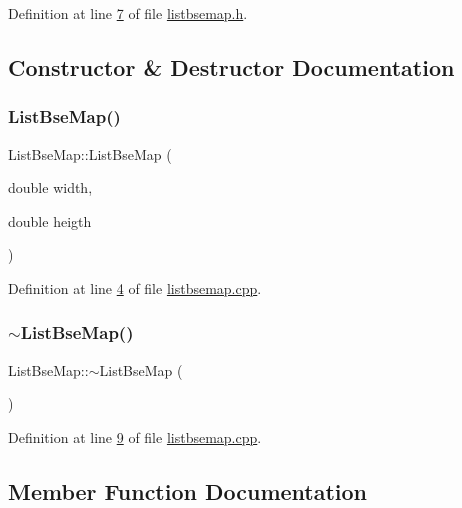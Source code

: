 Definition at line \hyperlink{a00065_source_l00007}{7} of file \hyperlink{a00065_source}{listbsemap.\+h}.



\subsection{Constructor \& Destructor Documentation}
\mbox{\label{a00169_aa9b6a13fa97af5ed567966cb8a1bc55f}} 
\subsubsection{\texorpdfstring{List\+Bse\+Map()}{ListBseMap()}}
{\footnotesize\ttfamily List\+Bse\+Map\+::\+List\+Bse\+Map (\begin{DoxyParamCaption}\item[{double}]{width,  }\item[{double}]{heigth }\end{DoxyParamCaption})}



Definition at line \hyperlink{a00062_source_l00004}{4} of file \hyperlink{a00062_source}{listbsemap.\+cpp}.

\mbox{\label{a00169_a186089a0e91ae5e4d2c76ab03b240842}} 
\subsubsection{\texorpdfstring{$\sim$\+List\+Bse\+Map()}{~ListBseMap()}}
{\footnotesize\ttfamily List\+Bse\+Map\+::$\sim$\+List\+Bse\+Map (\begin{DoxyParamCaption}{ }\end{DoxyParamCaption})}



Definition at line \hyperlink{a00062_source_l00009}{9} of file \hyperlink{a00062_source}{listbsemap.\+cpp}.



\subsection{Member Function Documentation}
\mbox{\label{a00169_a78e72bacec177f3512323c5fc7db11f3}} 
